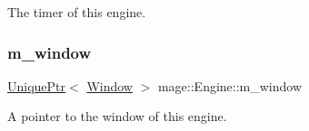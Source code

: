 The timer of this engine. \hypertarget{classmage_1_1_engine_a8b710b9c37a48caad05896102c4b6980}{}\label{classmage_1_1_engine_a8b710b9c37a48caad05896102c4b6980} 
\subsubsection{\texorpdfstring{m\+\_\+window}{m\_window}}
{\footnotesize\ttfamily \hyperlink{namespacemage_a3316d7143a973e37adf1110f2e80ca31}{Unique\+Ptr}$<$ \hyperlink{classmage_1_1_window}{Window} $>$ mage\+::\+Engine\+::m\+\_\+window\hspace{0.3cm}{\ttfamily [private]}}

A pointer to the window of this engine. 
